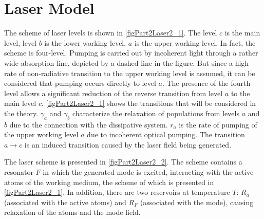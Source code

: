 \section{Laser Model}

The scheme of laser levels is shown in \autoref{figPart2Laser2_1}. The level $c$ is the main level, level $b$ is the lower working level, $a$ is the upper working level. In fact, the scheme is four-level. Pumping is carried out by incoherent light through a rather wide absorption line, depicted by a dashed line in the figure. But since a high rate of non-radiative transition to the upper working level is assumed, it can be considered that pumping occurs directly to level $a$. The presence of the fourth level allows a significant reduction of the reverse transition from level $a$ to the main level $c$. \autoref{figPart2Laser2_1} shows the transitions that will be considered in the theory. $\gamma_a$ and $\gamma_b$ characterize the relaxation of populations from levels $a$ and $b$ due to the connection with the dissipative system. $r_a$ is the rate of pumping of the upper working level $a$ due to incoherent optical pumping. The transition $a \rightarrow c$ is an induced transition caused by the laser field being generated.



The laser scheme is presented in \autoref{figPart2Laser2_2}. The scheme contains a resonator $F$ in which the generated mode is excited, interacting with the active atoms of the working medium, the scheme of which is presented in \autoref{figPart2Laser2_1}. In addition, there are two reservoirs at temperature $T$: $R_{a}$ (associated with the active atoms) and $R_{F}$ (associated with the mode), causing relaxation of the atoms and the mode field.

